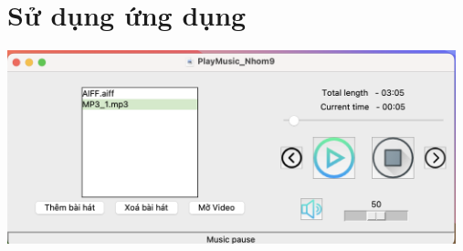 \documentclass[a4paper]{article}
\begin{document}
\section{Sử dụng ứng dụng}
\begin{center}
\includegraphics[width=130mm]{template_SGU 2/giaodien.png}
\end{center}
\end{document}
